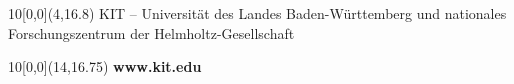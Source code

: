\begin{titlepage}
\vspace{2cm}


\begin{textblock}{10}[0,0](4,16.8)
\tiny{ 
		{KIT -- Universität des Landes Baden-Württemberg und nationales Forschungszentrum der Helmholtz-Gesellschaft}
}
\end{textblock}

\begin{textblock}{10}[0,0](14,16.75)
\large{
	\textbf{www.kit.edu} 
}
\end{textblock}

\end{titlepage}
